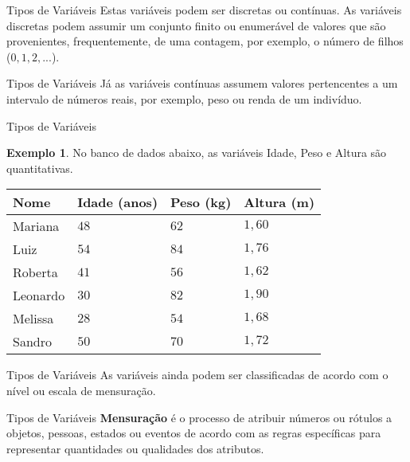 \documentclass[10pt]{beamer}
\renewcommand{\indent}{\hspace*{2em}}
\theoremstyle{definition}
\newtheorem{ex}[defn]{\textcolor{strpink}{Exemplo}}
\begin{document}
\begin{frame}{Tipos de Variáveis}
\indent Estas variáveis podem ser discretas ou contínuas. As variáveis discretas podem assumir um conjunto finito ou enumerável de valores que são provenientes, frequentemente, de uma contagem, por exemplo, o número de filhos ($0,1,2,...$).
\end{frame}

\begin{frame}{Tipos de Variáveis}
\indent Já as variáveis contínuas assumem valores pertencentes a um intervalo de números reais, por exemplo, peso ou renda de um indivíduo.
\end{frame}

\begin{frame}{Tipos de Variáveis}
\begin{ex}
\vfill\indent No banco de dados abaixo, as variáveis Idade, Peso e Altura são quantitativas.
\begin{table}[]
\begin{tabular}{|l|l|l|l|}
\hline
 Nome & Idade (anos) & Peso (kg) & Altura (m) \\ \hline
 Mariana & $48$ & $62$ & $1,60$ \\ \hline
 Luiz & $54$ & $84$ & $1,76$ \\ \hline
 Roberta & $41$ & $56$ & $1,62$ \\ \hline
 Leonardo & $30$ & $82$ & $1,90$ \\ \hline
 Melissa & $28$ & $54$ & $1,68$ \\ \hline
 Sandro & $50$ & $70$ & $1,72$ \\ \hline
\end{tabular}
\end{table}
\end{ex}
\end{frame}

\begin{frame}{Tipos de Variáveis}
\indent As variáveis ainda podem ser classificadas de acordo com o nível ou escala de mensuração.
\end{frame}

\begin{frame}{Tipos de Variáveis}
\indent \textbf{Mensuração} é o processo de atribuir números ou rótulos a objetos, pessoas, estados ou eventos de acordo com as regras específicas para representar quantidades ou qualidades dos atributos.
\end{frame}
\end{document}
